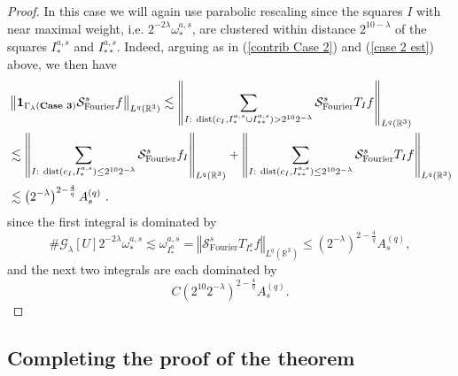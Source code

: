 \documentclass{amsart}%
\theoremstyle{plain}
\numberwithin{equation}{section}
\begin{document}
\begin{proof}
In this case we will again use parabolic rescaling since the squares $I$ with
near maximal weight, i.e. $2^{-2\lambda}\omega_{\ast}^{a,s}$, are clustered
within distance $2^{10-\lambda}$ of the squares $I_{\ast}^{a,s}$ and
$I_{\ast\ast}^{a,s}$. Indeed, arguing as in (\ref{contrib Case 2}) and
(\ref{case 2 est}) above, we then have%
\begin{align*}
&  \left\Vert \mathbf{1}_{\Gamma_{\lambda}\left(  \text{\textbf{Case 3}%
}\right)  }\mathcal{S}_{\operatorname*{Fourier}}^{s}f\right\Vert
_{L^{q}\left(  \mathbb{R}^{3}\right)  }\lesssim\left\Vert \sum
_{I:\ \operatorname*{dist}\left(  c_{I},I_{\ast}^{a,s}\cup I_{\ast\ast}%
^{a,s}\right)  >2^{10}2^{-\lambda}}\mathcal{S}_{\operatorname*{Fourier}}%
^{s}T_{I}f\right\Vert _{L^{q}\left(  \mathbb{R}^{3}\right)  }\\
&  \lesssim\left\Vert \sum_{I:\ \operatorname*{dist}\left(  c_{I},I_{\ast
}^{a,s}\right)  \leq2^{10}2^{-\lambda}}\mathcal{S}_{\operatorname*{Fourier}%
}^{s}f_{I}\right\Vert _{L^{q}\left(  \mathbb{R}^{3}\right)  }+\left\Vert
\sum_{I:\ \operatorname*{dist}\left(  c_{I},I_{\ast\ast}^{a,s}\right)
\leq2^{10}2^{-\lambda}}\mathcal{S}_{\operatorname*{Fourier}}^{s}%
T_{I}f\right\Vert _{L^{q}\left(  \mathbb{R}^{3}\right)  }\\
&  \lesssim\left(  2^{-\lambda}\right)  ^{2-\frac{4}{q}}A_{s}^{\left(
q\right)  }\ .
\end{align*}
since the first integral is dominated by%
\[
\#\mathcal{G}_{\lambda}\left[  U\right]  2^{-2\lambda}\omega_{\ast}%
^{a,s}\lesssim\omega_{I_{\ast}^{a}}^{a,s}=\left\Vert \mathcal{S}%
_{\operatorname*{Fourier}}^{s}T_{I_{\ast}^{a}}f\right\Vert _{L^{q}\left(
\mathbb{R}^{3}\right)  }\leq\left(  2^{-\lambda}\right)  ^{2-\frac{4}{q}}%
A_{s}^{\left(  q\right)  },
\]
and the next two integrals are each dominated by%
\[
C\left(  2^{10}2^{-\lambda}\right)  ^{2-\frac{4}{q}}A_{s}^{\left(  q\right)
}.
\]

\end{proof}

\subsection{Completing the proof of the theorem}
\end{document}
